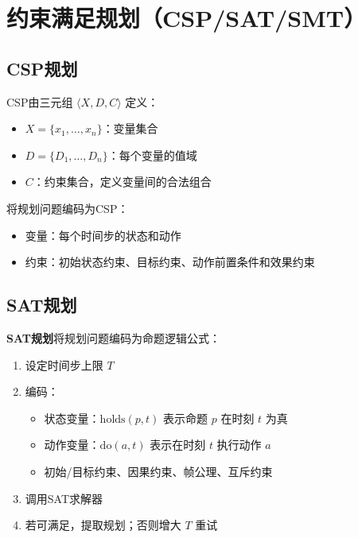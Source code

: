 \section{约束满足规划（CSP/SAT/SMT）}

\subsection{CSP规划}

\begin{definition}
CSP由三元组 $\langle X, D, C \rangle$ 定义：
\begin{itemize}
  \item $X = \{x_1, \ldots, x_n\}$：变量集合
  \item $D = \{D_1, \ldots, D_n\}$：每个变量的值域
  \item $C$：约束集合，定义变量间的合法组合
\end{itemize}
\end{definition}

将规划问题编码为CSP：
\begin{itemize}[leftmargin=2em]
  \item 变量：每个时间步的状态和动作
  \item 约束：初始状态约束、目标约束、动作前置条件和效果约束
\end{itemize}

\subsection{SAT规划}

\textbf{SAT规划}将规划问题编码为命题逻辑公式：

\begin{algbox}[SAT规划框架]
\begin{enumerate}
  \item 设定时间步上限 $T$
  \item 编码：
    \begin{itemize}
      \item 状态变量：$\text{holds}(p, t)$ 表示命题 $p$ 在时刻 $t$ 为真
      \item 动作变量：$\text{do}(a, t)$ 表示在时刻 $t$ 执行动作 $a$
      \item 初始/目标约束、因果约束、帧公理、互斥约束
    \end{itemize}
  \item 调用SAT求解器
  \item 若可满足，提取规划；否则增大 $T$ 重试
\end{enumerate}
\end{algbox}

